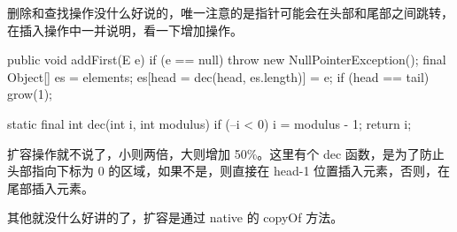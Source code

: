 删除和查找操作没什么好说的，唯一注意的是指针可能会在头部和尾部之间跳转，在插入操作中一并说明，看一下增加操作。

\begin{Java}
public void addFirst(E e) {
    if (e == null)
        throw new NullPointerException();
    final Object[] es = elements;
    es[head = dec(head, es.length)] = e;
    if (head == tail)
        grow(1);
}

static final int dec(int i, int modulus) {
    if (--i < 0) i = modulus - 1;
    return i;
}
\end{Java}

扩容操作就不说了，小则两倍，大则增加 50\%。这里有个 dec 函数，是为了防止头部指向下标为 0 的区域，如果不是，则直接在 head-1 位置插入元素，否则，在尾部插入元素。

其他就没什么好讲的了，扩容是通过 native 的 copyOf 方法。

\newpage
